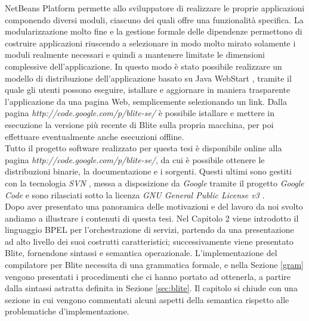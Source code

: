 NetBeans Platform permette allo sviluppatore di realizzare le proprie
applicazioni componendo diversi moduli, ciascuno dei quali offre una
funzionalità specifica. La modularizzazione molto fine e la gestione
formale delle dipendenze permettono di costruire applicazioni riuscendo a
selezionare in modo molto mirato solamente i moduli realmente necessari e
quindi a mantenere limitate le dimensioni complessive dell'applicazione. 
In questo modo è stato possibile realizzare un modello di distribuzione
dell'applicazione basato su Java WebStart \cite{JavaWS}, tramite il quale gli
utenti possono eseguire, istallare e aggiornare in maniera trasparente l'applicazione
da una pagina Web, semplicemente selezionando un link. Dalla pagina 
\emph{http://code.google.com/p/blite-se/} è possibile istallare e mettere in
esecuzione la versione più recente di Blite sulla propria macchina,
per poi effettuare eventualmente anche esecuzioni offline.
\\

Tutto il progetto software realizzato per questa tesi è disponibile online alla
pagina \emph{http://code.google.com/p/blite-se/}, da cui è possibile ottenere le
distribuzioni binarie, la documentazione e i sorgenti. Questi ultimi sono
gestiti con la tecnologia \emph{SVN} \cite{SVN}, messa a disposizione da
\emph{Google} tramite il progetto \emph{Google Code} \cite{GCode} e sono rilasciati
sotto la licenza \emph{GNU General Public License v3} \cite{GPLv3}.
\\

% 

Dopo aver presentato una panoramica delle motivazioni e del lavoro da noi svolto
andiamo a illustrare i contenuti di questa tesi. Nel Capitolo 2 viene introdotto
il linguaggio BPEL per l'orchestrazione di servizi, partendo da una
presentazione ad alto livello dei suoi costrutti caratteristici; successivamente viene presentato
Blite, fornendone sintassi e semantica operazionale.
L'implementazione del compilatore per Blite necessita di una grammatica formale,
e nella Sezione \ref{gram} vengono presentati i procedimenti che ci hanno portato ad
ottenerla, a partire dalla sintassi astratta definita in Sezione \ref{sec:blite}. Il
capitolo si chiude con una sezione in cui vengono commentati alcuni aspetti
della semantica rispetto alle problematiche d'implementazione.

